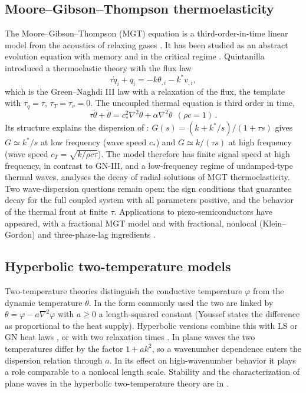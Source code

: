 \subsection{Moore--Gibson--Thompson thermoelasticity}\label{sec:mgt}
The Moore--Gibson--Thompson (MGT) equation is a third-order-in-time linear model from the acoustics of relaxing gases \citep{MooreGibson1960}. It has been studied as an abstract evolution equation with memory and in the critical regime \citep{MarchandMcDevittTriggiani2012,LasieckaWang2015MGT,DellOroLasieckaPata2016MGT,DellOroPata2016Viscoelasticity}. Quintanilla \citep{Quintanilla2019} introduced a thermoelastic theory with the flux law
\begin{equation}
\tau\dot q_i+q_i=-k\theta_{,i}-k^*v_{,i},
\end{equation}
which is the Green--Naghdi III law with a relaxation of the flux, the template with $\tau_q=\tau$, $\tau_T=\tau_v=0$. The uncoupled thermal equation is third order in time,
\begin{equation}
\tau\dddot\theta+\ddot\theta=c_*^2\nabla^2\theta+\alpha\nabla^2\dot\theta\ \ (\rho c=1)\,.
\end{equation}
Its structure explains the dispersion of : $G(s)=(k+k^*/s)/(1+\tau s)$ gives $G\simeq k^*/s$ at low frequency (wave speed $c_*$) and $G\simeq k/(\tau s)$ at high frequency (wave speed $c_T=\sqrt{k/\rho c\tau}$). The model therefore has finite signal speed at high frequency, in contrast to GN-III, and a low-frequency regime of undamped-type thermal waves. \citep{Bazarra2021MGTradial} analyses the decay of radial solutions of MGT thermoelasticity. Two wave-dispersion questions remain open: the sign conditions that guarantee decay for the full coupled system with all parameters positive, and the behavior of the thermal front at finite $\tau$. Applications to piezo-semiconductors have appeared, with a fractional MGT model \citep{Gupta2024} and with fractional, nonlocal (Klein--Gordon) and three-phase-lag ingredients \citep{Aldandani2026}.

\subsection{Hyperbolic two-temperature models}
Two-temperature theories \citep{ChenGurtin1968,Youssef2006} distinguish the conductive temperature $\varphi$ from the dynamic temperature $\theta$. In the form commonly used the two are linked by $\theta=\varphi-a\nabla^2\varphi$ with $a\ge0$ a length-squared constant (Youssef states the difference as proportional to the heat supply). Hyperbolic versions combine this with LS or GN heat laws \citep{Prasad2020,Alzahrani2020}, or with two relaxation times \citep{Bassiouny2020}. In plane waves the two temperatures differ by the factor $1+ak^2$, so a wavenumber dependence enters the dispersion relation through $a$. In its effect on high-wavenumber behavior it plays a role comparable to a nonlocal length scale. Stability and the characterization of plane waves in the hyperbolic two-temperature theory are in \citep{Prasad2020}.

